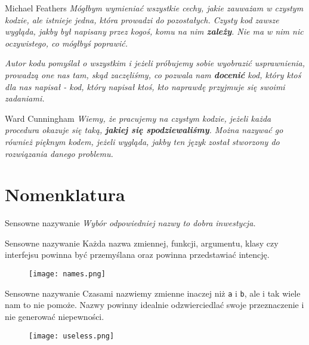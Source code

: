 \begin{frame}{Michael Feathers}
	\emph{Mógłbym wymieniać wszystkie cechy, jakie zauważam w czystym kodzie, ale istnieje jedna, która prowadzi do pozostałych. Czysty kod zawsze wygląda, jakby był napisany przez kogoś, komu na nim \textbf{zależy}. Nie ma w nim nic oczywistego, co mógłbyś poprawić.}
	
	\emph{Autor kodu pomyślał o wszystkim i jeżeli próbujemy sobie wyobrazić usprawnienia, prowadzą one nas tam, skąd zaczęliśmy, co pozwala nam \textbf{docenić} kod, który ktoś dla nas napisał - kod, który napisał ktoś, kto naprawdę przyjmuje się swoimi zadaniami.}
\end{frame}

\begin{frame}{Ward Cunningham}
	\emph{Wiemy, że pracujemy na czystym kodzie, jeżeli każda procedura okazuje się taką, \textbf{jakiej się spodziewaliśmy}. Można nazywać go również pięknym kodem, jeżeli wygląda, jakby ten język został stworzony do rozwiązania danego problemu.}
\end{frame}

\section{Nomenklatura}

\begin{frame}{Sensowne nazywanie}
	\emph{Wybór odpowiedniej nazwy to dobra inwestycja.}
\end{frame}

\begin{frame}{Sensowne nazywanie}
	Każda nazwa zmiennej, funkcji, argumentu, klasy czy interfejsu powinna być przemyślana oraz powinna przedstawiać intencję.
\end{frame}

\begin{frame}
	\begin{figure} \centering
		\texttt{[image: names.png]}
	\end{figure}
\end{frame}

\begin{frame}{Sensowne nazywanie}
	Czasami nazwiemy zmienne inaczej niż \texttt{a} i \texttt{b}, ale i tak wiele nam to nie pomoże. Nazwy powinny idealnie odzwierciedlać swoje przeznaczenie i nie generować niepewności.
\end{frame}

\begin{frame}
	\begin{figure} \centering
		\texttt{[image: useless.png]}
	\end{figure}
\end{frame}

